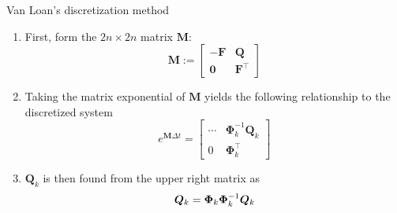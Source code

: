     \begin{algorithm}[!htbp]
        \caption{Van Loan's discretization method}
	    \label{alg:vanloan}
        \begin{minipage}{\dimexpr\textwidth-2\algomargin\relax}
            \begin{enumerate}
            \item First, form the $2n\times2n$ matrix $\bm{M}$:
            \begin{equation}
                \mathbf{M} := \left[\begin{array}{cc}-\mathbf{F} & {\mathbf{Q}} \\ {\mathbf{0}} & {\mathbf{F}^{\top}}\end{array}\right]
            \end{equation}
            \item Taking the matrix exponential of $\bm{M}$ yields the following relationship to the discretized system
            \begin{equation}
                e^{\mathbf{M} \Delta t} = \left[ \begin{array}{cc}{\cdots} & {\bm{\Phi}_{k}^{-1} \mathbf{Q}_{k}} \\ {0} & {\bm{\Phi}_{k}^{\top}}\end{array}\right]
            \end{equation}
            \item $\bm{Q}_k$ is then found from the upper right matrix as
            \begin{equation}
                \bm{Q}_k = \bm{\Phi}_k\bm{\Phi}_k^{-1}\bm{Q}_k
            \end{equation}
            \end{enumerate}
            \vspace{0.1cm}
        \end{minipage}
    \end{algorithm}

          
    
